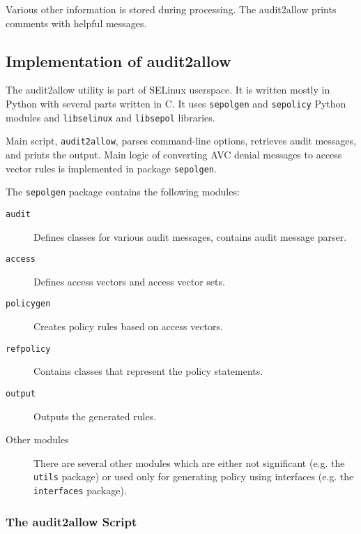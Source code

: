 Various other information is stored during processing. The audit2allow prints
comments with helpful messages.

\subsection{Implementation of audit2allow}
The audit2allow utility is part of SELinux userspace. It is written mostly in
Python with several parts written in C. It uses \texttt{sepolgen} and
\texttt{sepolicy} Python modules and \texttt{libselinux} and \texttt{libsepol}
libraries.

Main script, \texttt{audit2allow}, parses command-line options, retrieves audit
messages, and prints the output.  Main logic of converting AVC denial messages
to access vector rules is implemented in package \texttt{sepolgen}.

The \texttt{sepolgen} package contains the following modules:
\begin{description}
    \item [\texttt{audit}] Defines classes for various audit messages, contains
        audit message parser.
    \item [\texttt{access}] Defines access vectors and access vector sets.
    \item [\texttt{policygen}] Creates policy rules based on access vectors.
    \item [\texttt{refpolicy}] Contains classes that represent the policy
        statements.
    \item [\texttt{output}] Outputs the generated rules.
    \item [Other modules] There are several other modules which are either not
        significant (e.g. the \texttt{utils} package) or used only for
        generating policy using interfaces (e.g. the \texttt{interfaces}
        package).
\end{description}

\subsubsection{The audit2allow Script}

